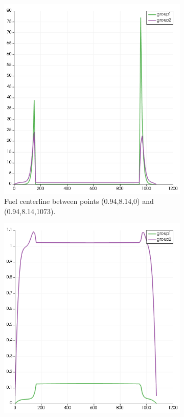\documentclass[11pt,letterpaper]{article}
\begin{document}
	\begin{figure}[htbp!]
		\centering
		\begin{subfigure}[t]{0.4\textwidth}
			\centering
			\includegraphics[width=\linewidth]{3D-assembly1}
			\caption{Fuel centerline between points (0.94,8.14,0) and (0.94,8.14,1073).}
		\end{subfigure}
		\begin{subfigure}[t]{0.4\textwidth}
			\centering
			\includegraphics[width=\linewidth]{3D-assembly2}

\end{subfigure}
\end{figure}
\end{document}
